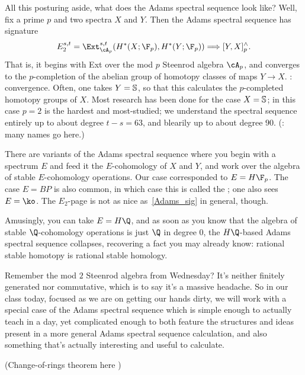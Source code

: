 All this posturing aside, what does the Adams spectral sequence look like? Well, fix a prime $p$ and two spectra
$X$ and $Y$. Then the Adams spectral sequence has signature
\begin{equation}
\label{Adams_sig}
	E_2^{s,t} = \Ext_{\cA_p}^{s,t}(H^*(X;\F_p), H^*(Y; \F_p)) \Longrightarrow [Y, X]_p^\wedge.
\end{equation}
That is, it begins with Ext over the mod $p$ Steenrod algebra $\cA_p$, and converges to the $p$-completion of the
abelian group of homotopy classes of maps $Y\to X$. \TODO: convergence. Often, one takes $Y = \S$, so that this
calculates the $p$-completed homotopy groups of $X$. Most research has been done for the case $X = \S$; in this
case $p = 2$ is the hardest and most-studied; we understand the spectral sequence entirely up to about degree $t -
s = 63$, and blearily up to about degree $90$. (\TODO: many names go here.)
\begin{rem}
There are variants of the Adams spectral sequence where you begin with a spectrum $E$ and feed it the
$E$-cohomology of $X$ and $Y$, and work over the algebra of stable $E$-cohomology operations. Our case corresponded
to $E = H\F_p$. The case $E = \mathit{BP}$ is also common, in which case this is called the ; one also sees $E = \ko$. The $E_2$-page is not as nice as~\eqref{Adams_sig} in general, though.

Amusingly, you can take $E = H\Q$, and as soon as you know that the algebra of stable $\Q$-cohomology operations is
just $\Q$ in degree $0$, the $H\Q$-based Adams spectral sequence collapses, recovering a fact you may already know:
rational stable homotopy is rational stable homology.
\end{rem}
Remember the mod $2$ Steenrod algebra from Wednesday? It's neither finitely generated nor commutative, which is to
say it's a massive headache. So in our class today, focused as we are on getting our hands dirty, we will work with
a special case of the Adams spectral sequence which is simple enough to actually teach in a day, yet complicated
enough to both feature the structures and ideas present in a more general Adams spectral sequence calculation, and
also something that's actually interesting and useful to calculate.

(Change-of-rings theorem here \TODO)

